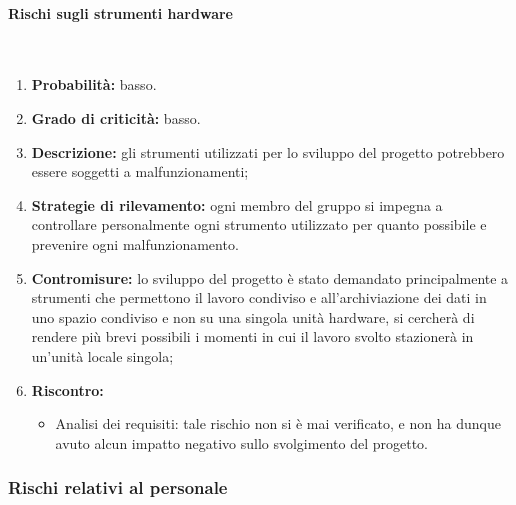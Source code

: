 \paragraph{Rischi sugli strumenti hardware}\mbox{}\\
\begin{enumerate}
	\item \textbf{Probabilità:} basso.
	\item \textbf{Grado di criticità:} basso.
	\item \textbf{Descrizione:} gli strumenti utilizzati per lo sviluppo del progetto potrebbero essere soggetti a malfunzionamenti;
	\item \textbf{Strategie di rilevamento:} ogni membro del gruppo si impegna a controllare personalmente ogni strumento utilizzato per quanto possibile e prevenire ogni malfunzionamento.
	\item \textbf{Contromisure:} lo sviluppo del progetto è stato demandato principalmente a strumenti che permettono il lavoro condiviso e all’archiviazione dei dati in uno spazio condiviso e non su una singola unità hardware, si cercherà di rendere più brevi possibili i momenti in cui il lavoro svolto stazionerà in un’unità locale singola;
	\item \textbf{Riscontro:} 
	\begin{itemize}
		\item Analisi dei requisiti: tale rischio non si è mai verificato, e non ha dunque avuto alcun impatto negativo sullo svolgimento del progetto.
	\end{itemize}
\end{enumerate}

\subsubsection{Rischi relativi al personale}
